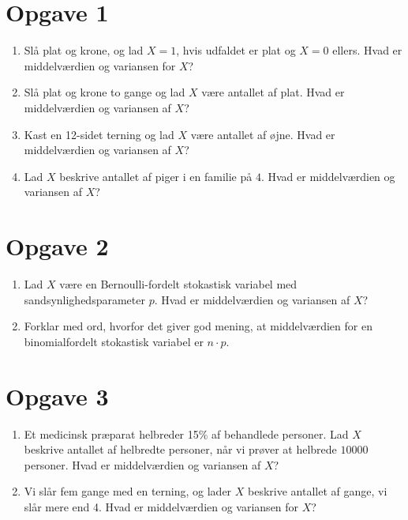 \section*{Opgave 1}
\begin{enumerate}[label=\roman*)]
\item Slå plat og krone, og lad $X=1$, hvis udfaldet er plat og $X=0$ ellers. Hvad er middelværdien og variansen for $X$?
\item Slå plat og krone to gange og lad $X$ være antallet af plat. Hvad er middelværdien og variansen af $X$?
\item Kast en 12-sidet terning og lad $X$ være antallet af øjne. Hvad er middelværdien og variansen af $X$?
\item Lad $X$ beskrive antallet af piger i en familie på $4$. Hvad er middelværdien og variansen af $X$?
\end{enumerate}

\section*{Opgave 2}
\begin{enumerate}[label=\roman*)]
\item Lad $X$ være en Bernoulli-fordelt stokastisk variabel med sandsynlighedsparameter $p$. Hvad er middelværdien og variansen af $X$?
\item Forklar med ord, hvorfor det giver god mening, at middelværdien for en binomialfordelt stokastisk variabel er $n\cdot p$. 
\end{enumerate}

\section*{Opgave 3}
\begin{enumerate}[label=\roman*)]
\item Et medicinsk præparat helbreder 15$\%$ af behandlede personer. Lad $X$ beskrive antallet af helbredte personer, når vi prøver at helbrede $10000$ personer. Hvad er middelværdien og variansen af $X$?
\item Vi slår fem gange med en terning, og lader $X$ beskrive antallet af gange, vi slår mere end 4. Hvad er middelværdien og variansen for $X$?
\end{enumerate}
